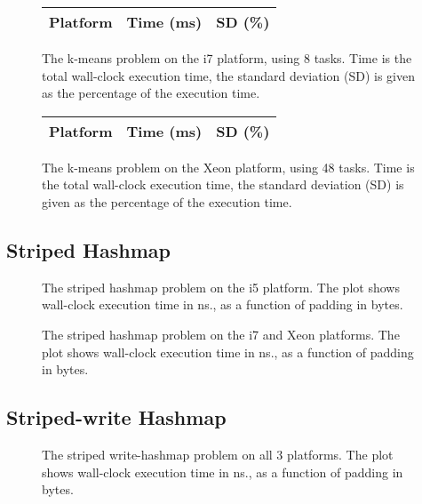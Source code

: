 \begin{figure}[hbtp]
	\centering
	\begin{tabular}{l r r}
		\hline
		\hline
		Platform & Time (ms) & SD (\%) \\
		\hline
		
		\hline
		\hline
	\end{tabular}
	\caption{The k-means problem on the i7 platform, using 8 tasks.  Time is
	the total wall-clock execution time, the standard deviation (SD) is
	given as the percentage of the execution time.}
	\label{table:kmeans-i7}
\end{figure}

\begin{figure}[hbtp]
	\centering
	\begin{tabular}{l r r}
		\hline
		\hline
		Platform & Time (ms) & SD (\%) \\
		\hline
		
		\hline
		\hline
	\end{tabular}
	\caption{The k-means problem on the Xeon platform, using 48 tasks.
	Time is the total wall-clock execution time, the standard deviation (SD)
	is given as the percentage of the execution time.}
	\label{table:kmeans-xeon}
\end{figure}

\subsection{Striped Hashmap}

\begin{figure}[hbpt]
\graphicspath{{plots/}}

\caption{The striped hashmap problem on the i5 platform. The plot shows
	wall-clock execution time in ns., as a function of padding in bytes.}
\label{fig:hashmap-striped-i5}
\end{figure}

\begin{figure}[hbpt]
\graphicspath{{plots/}}

\caption{The striped hashmap problem on the i7 and Xeon platforms. The plot shows
	wall-clock execution time in ns., as a function of padding in bytes.}
\label{fig:hashmap-striped-i7}
\end{figure}

\subsection{Striped-write Hashmap}

\begin{figure}[hbpt]
\graphicspath{{plots/}}

\caption{The striped write-hashmap problem on all 3 platforms. The plot shows
	wall-clock execution time in ns., as a function of padding in bytes.}
\label{fig:hashmap-striped-xeon}
\end{figure}
